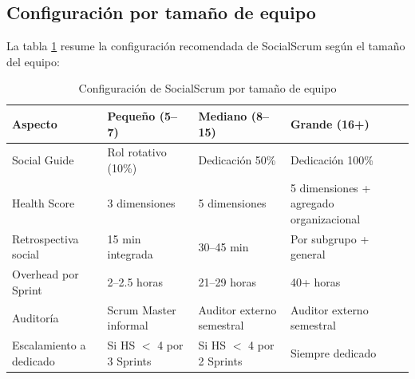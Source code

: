 \subsection{Configuración por tamaño de equipo}

La tabla \ref{tab:config-por-tamano} resume la configuración recomendada de SocialScrum según el tamaño del equipo:

\begin{table}[h]
    \centering
    \small
    \begin{tabularx}{\textwidth}{|l|X|X|X|}
        \hline
        \textbf{Aspecto} & \textbf{Pequeño (5--7)}                 & \textbf{Mediano (8--15)} & \textbf{Grande (16+)} \\
        \hline
        Social Guide
                         & Rol rotativo (10\%)
                         & Dedicación 50\%
                         & Dedicación 100\%                                                                           \\
        \hline
        Health Score
                         & 3 dimensiones
                         & 5 dimensiones
                         & 5 dimensiones + agregado organizacional                                                    \\
        \hline
        Retrospectiva social
                         & 15 min integrada
                         & 30--45 min
                         & Por subgrupo + general                                                                     \\
        \hline
        Overhead por Sprint
                         & 2--2.5 horas
                         & 21--29 horas
                         & 40+ horas                                                                                  \\
        \hline
        Auditoría
                         & Scrum Master informal
                         & Auditor externo semestral
                         & Auditor externo semestral                                                                  \\
        \hline
        Escalamiento a dedicado
                         & Si HS $<$ 4 por 3 Sprints
                         & Si HS $<$ 4 por 2 Sprints
                         & Siempre dedicado                                                                           \\
        \hline
    \end{tabularx}
    \caption{Configuración de SocialScrum por tamaño de equipo}
    \label{tab:config-por-tamano}
\end{table}
\FloatBarrier

